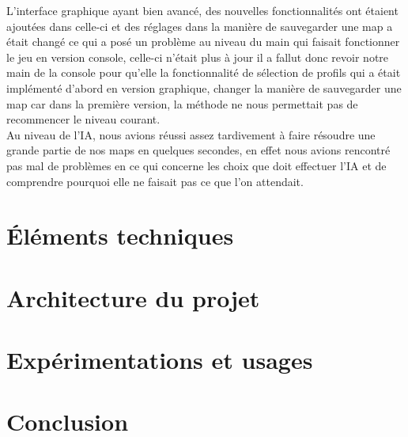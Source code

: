 \documentclass[a4paper,12pt]{article} %
\begin{document}
L'interface graphique ayant bien avancé, des nouvelles fonctionnalités ont étaient ajoutées dans celle-ci et des réglages dans la manière de sauvegarder une map a était changé ce qui a posé un problème au niveau du main qui faisait fonctionner le jeu en version console, celle-ci n'était plus à jour il a fallut donc revoir notre main de la console pour qu'elle la fonctionnalité de sélection de profils qui a était implémenté d'abord en version graphique, changer la manière de sauvegarder une map car dans la première version, la méthode ne nous permettait pas de recommencer le niveau courant.\\

Au niveau de l'IA, nous avions réussi assez tardivement à faire résoudre une grande partie de nos maps en quelques secondes, en effet nous avions rencontré pas mal de problèmes en ce qui concerne les choix que doit effectuer l'IA et de comprendre pourquoi elle ne faisait pas ce que l'on attendait.

\section{Éléments techniques}

\section{Architecture du projet}

\section{Expérimentations et usages}

\section*{Conclusion}
\end{document}
